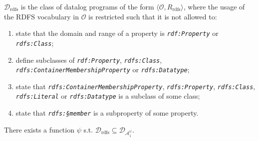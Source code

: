 \documentclass{article}
\begin{document}
\begin{definition}\label{def:drdfs} $\mathcal{D}_{\text{rdfs}}$ is the class of datalog programs of the form $\langle\mathcal{O}, R_{\text{rdfs}}\rangle$, where the usage of the RDFS vocabulary 
in $\mathcal{O}$ is restricted such that it is not allowed to:
\begin{enumerate}
\item state that the domain and range of a property is {\small\texttt{\emph{rdf:Property}}}
or {\small\texttt{\emph{rdfs:Class}}};
\item define subclasses of {\small\texttt{\emph{rdf:Property}}},
{\small\texttt{\emph{rdfs:Class}}}, {\small\texttt{\emph{rdfs:ContainerMembershipProperty}}} or {\small\texttt{\emph{rdfs:Datatype}}};
\item state that {\small\texttt{\emph{rdfs:ContainerMembershipProperty}}}, {\small\texttt{\emph{rdfs:Property}}}, {\small\texttt{\emph{rdfs:Class}}}, {\small\texttt{\emph{rdfs:Literal}}} or {\small\texttt{\emph{rdfs:Datatype}}} is a subclass of some class;
\item state that {\small\texttt{\emph{rdfs:§member}}} is a subproperty of some property.
\end{enumerate}
\end{definition}

\begin{theorem} There exists a function $\psi$ s.t. $\mathcal{D}_{\text{rdfs}}\subseteq\mathcal{D}_{\mathcal{A}_1^{\psi}}$.
\end{theorem}
\end{document}
